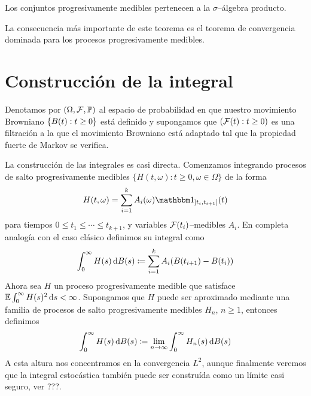 \begin{theorem}
  Los conjuntos progresivamente medibles pertenecen a la \(\sigma\)--álgebra producto.
\end{theorem}

La consecuencia más importante de este teorema es el teorema de convergencia dominada para los procesos progresivamente medibles.

\section{Construcción de la integral}
Denotamos por \((\Omega, \mathcal{F}, \mathbb{P})\) al espacio de probabilidad en que nuestro movimiento Browniano \(\{B(t) : t \geq 0\}\) está definido y supongamos que \((\mathcal{F}(t) : t \geq 0)\) es una filtración a la que el movimiento Browniano está adaptado tal que la propiedad fuerte de Markov se verifica.

La construcción de las integrales es casi directa.
Comenzamos integrando procesos de salto progresivamente medibles \(\{H(t, \omega) : t \geq 0, \omega \in \Omega\}\) de la forma
\begin{align}
  H(t, \omega)
  =
  \sum_{i = 1}^k A_i(\omega)\characteristic_{\left] t_i, t_{i + 1} \right]}(t)
\end{align}
para tiempos \(0 \leq t_1 \leq \cdots \leq t_{k + 1}\), y variables \(\mathcal{F}(t_i)\)--medibles \(A_i\).
En completa analogía con el caso clásico definimos su integral como
\begin{align}
  \int_0^{\infty} H(s) \mathop{}\!\mathrm{d} B(s)
  \coloneqq
  \sum_{i = 1}^k A_i (B(t_{i + 1}) - B(t_i))
\end{align}
Ahora sea \(H\) un proceso progresivamente medible que satisface \(\operatorname{\mathbb{E}} \int_0^{\infty} H(s)^2 \mathop{}\!\mathrm{d} s < \infty\).
Supongamos que \(H\) puede ser aproximado mediante una familia de procesos de salto progresivamente medibles \(H_n\), \(n \geq 1\), entonces definimos
\begin{align}
  \int_0^\infty H(s) \mathop{}\!\mathrm{d} B(s)
  \coloneqq
  \lim_{n \rightarrow \infty} \int_0^\infty H_n(s) \mathop{}\!\mathrm{d} B(s)
  \label{definition:stochasticIntegralWithRespectToBrownianMotion_norm2Approximation}
\end{align}
A esta altura nos concentramos en la convergencia \(L^2\), aunque finalmente veremos que la integral estocástica también puede ser construída como un límite casi seguro, ver ???.

